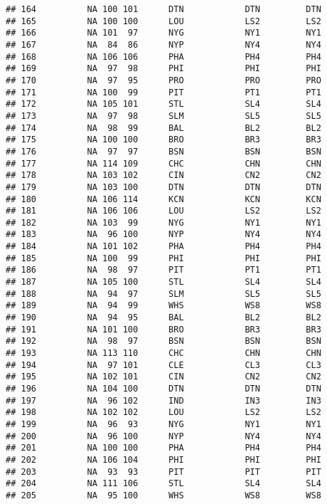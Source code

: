 \documentclass[]{article}
\begin{document}
\begin{verbatim}
## 164          NA 100 101      DTN            DTN         DTN
## 165          NA 100 100      LOU            LS2         LS2
## 166          NA 101  97      NYG            NY1         NY1
## 167          NA  84  86      NYP            NY4         NY4
## 168          NA 106 106      PHA            PH4         PH4
## 169          NA  97  98      PHI            PHI         PHI
## 170          NA  97  95      PRO            PRO         PRO
## 171          NA 100  99      PIT            PT1         PT1
## 172          NA 105 101      STL            SL4         SL4
## 173          NA  97  98      SLM            SL5         SL5
## 174          NA  98  99      BAL            BL2         BL2
## 175          NA 100 100      BRO            BR3         BR3
## 176          NA  97  97      BSN            BSN         BSN
## 177          NA 114 109      CHC            CHN         CHN
## 178          NA 103 102      CIN            CN2         CN2
## 179          NA 103 100      DTN            DTN         DTN
## 180          NA 106 114      KCN            KCN         KCN
## 181          NA 106 106      LOU            LS2         LS2
## 182          NA 103  99      NYG            NY1         NY1
## 183          NA  96 100      NYP            NY4         NY4
## 184          NA 101 102      PHA            PH4         PH4
## 185          NA 100  99      PHI            PHI         PHI
## 186          NA  98  97      PIT            PT1         PT1
## 187          NA 105 100      STL            SL4         SL4
## 188          NA  94  97      SLM            SL5         SL5
## 189          NA  94  99      WHS            WS8         WS8
## 190          NA  94  95      BAL            BL2         BL2
## 191          NA 101 100      BRO            BR3         BR3
## 192          NA  98  97      BSN            BSN         BSN
## 193          NA 113 110      CHC            CHN         CHN
## 194          NA  97 101      CLE            CL3         CL3
## 195          NA 102 101      CIN            CN2         CN2
## 196          NA 104 100      DTN            DTN         DTN
## 197          NA  96 102      IND            IN3         IN3
## 198          NA 102 102      LOU            LS2         LS2
## 199          NA  96  93      NYG            NY1         NY1
## 200          NA  96 100      NYP            NY4         NY4
## 201          NA 100 100      PHA            PH4         PH4
## 202          NA 106 104      PHI            PHI         PHI
## 203          NA  93  93      PIT            PIT         PIT
## 204          NA 111 106      STL            SL4         SL4
## 205          NA  95 100      WHS            WS8         WS8

\end{verbatim}
\end{document}

